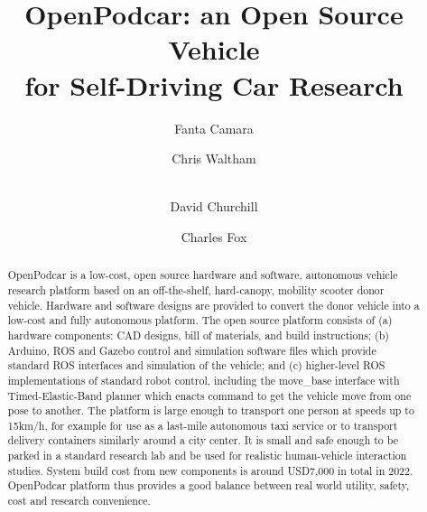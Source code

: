\documentclass[a4paper]{article}
\title{OpenPodcar: an Open Source Vehicle \\for Self-Driving Car Research}
\author[1,2]{Fanta Camara}
\author[2]{Chris Waltham}
\author[2]{\\David Churchill}
\author[1,2]{Charles Fox}
\affil[1]{Institute for Transport Studies, University of Leeds, UK}
\affil[2]{School of Computer Science, University of Lincoln, UK}
\begin{document}
	\maketitle
	
	
	\begin{abstract}
		OpenPodcar is a low-cost, open source hardware and software, autonomous vehicle research platform based on an off-the-shelf, hard-canopy, mobility scooter donor vehicle. Hardware and software designs are provided to convert the donor vehicle into a low-cost and fully autonomous platform. The open source platform consists of (a) hardware components: CAD designs, bill of materials, and build instructions; (b) Arduino, ROS and Gazebo control and simulation software files which provide standard ROS interfaces and simulation of the vehicle; and (c) higher-level ROS implementations of standard robot control, including the move\_base interface with Timed-Elastic-Band planner which enacts command to get the vehicle move from one pose to another. The platform is large enough to transport one person at speeds up to 15km/h, for example for use as a last-mile autonomous taxi service or to transport delivery containers similarly around a city center. It is small and safe enough to be parked in a standard research lab and be used for realistic human-vehicle interaction studies. System build cost from new components is around USD7,000 in total in 2022. OpenPodcar platform thus provides a good balance between real world utility, safety, cost and research convenience.
	\end{abstract}
	
\end{document}
